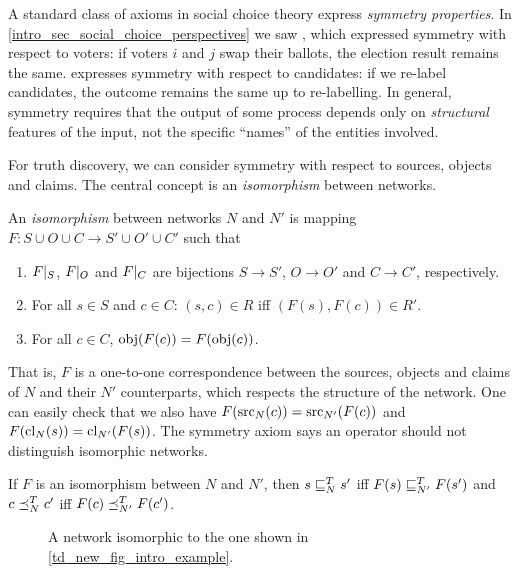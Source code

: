 A standard class of axioms in social choice theory express \emph{symmetry
properties}. In \cref{intro_sec_social_choice_perspectives} we saw
, which expressed symmetry with respect to voters: if
voters $i$ and $j$ swap their ballots, the election result remains the same.
 expresses symmetry with respect to candidates: if we
re-label candidates, the outcome remains the same up to re-labelling. In
general, symmetry requires that the output of some process depends only on
\emph{structural} features of the input, not the specific ``names'' of the
entities involved.

For truth discovery, we can consider symmetry with respect to sources, objects
and claims. The central concept is an \emph{isomorphism} between networks.

\begin{definition}
    An \emph{isomorphism} between networks $N$ and $N'$ is mapping $F: S \cup O
    \cup C \to S' \cup O' \cup C'$ such that
    \begin{enumerate}
        \item $F|_{S}$, $F|_{O}$ and $F|_{C}$ are
              bijections $S \to S'$, $O \to O'$ and $C \to C'$, respectively.
        \item For all $s \in S$ and $c \in C$: $(s, c) \in R$ iff $(F(s), F(c))
              \in R'$.
        \item For all $c \in C$, $\operatorname{obj}(F(c)) = F(\operatorname{obj}(c))$.
    \end{enumerate}
\end{definition}

That is, $F$ is a one-to-one correspondence between the sources, objects and
claims of $N$ and their $N'$ counterparts, which respects the structure of the
network. One can easily check that we also have $F(\operatorname{src}_N(c)) =
\operatorname{src}_{N'}(F(c))$ and $F(\operatorname{cl}_N(s)) = \operatorname{cl}_{N'}(F(s))$.
%
The symmetry axiom says an operator should not distinguish isomorphic networks.

\begin{axiom}[\symmetry{}]
    If $F$ is an isomorphism between $N$ and $N'$, then
    $s \sqsubseteq_N^T s'$ iff $F(s) \sqsubseteq_{N'}^T F(s')$ and $c \preceq_N^T c'$ iff $F(c)
    \preceq_{N'}^T F(c')$.
\end{axiom}

\begin{figure}
    \centering
    \caption{
        A network isomorphic to the one shown in \cref{td_new_fig_intro_example}.
    }
    \label{td_new_fig_symmetry_example}
\end{figure}

